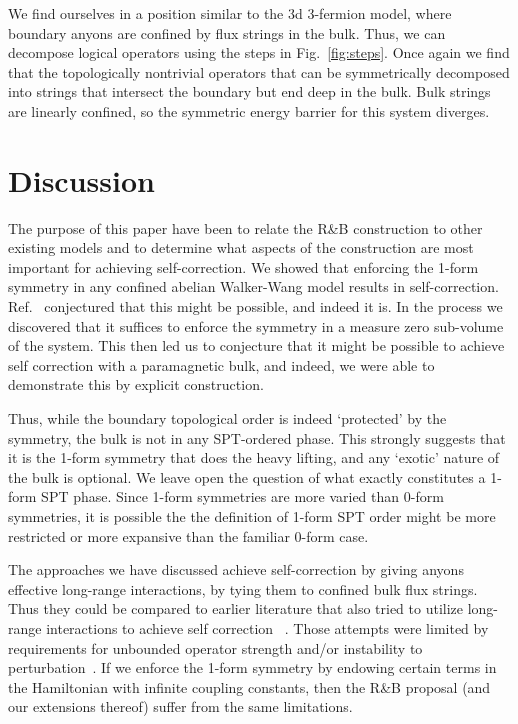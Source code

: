 \documentclass[twocolumn, longbibliography]{revtex4-2}
\begin{document}
We find ourselves in a position similar to the 3d 3-fermion model, where boundary anyons are confined by flux strings in the bulk. Thus, we can decompose logical operators using the steps in Fig.~\ref{fig:steps}. Once again we find that the topologically nontrivial operators that can be symmetrically decomposed into strings that intersect the boundary but end deep in the bulk. Bulk strings are linearly confined, so the symmetric energy barrier for this system diverges.

\section{Discussion}

The  purpose of this paper have been to relate the R\&B construction to other existing models and to determine what aspects of the construction are most important for achieving self-correction. We showed that enforcing the 1-form symmetry in any confined abelian Walker-Wang model results in self-correction. Ref.~\cite{RobertsBartlett} conjectured that this might be possible, and indeed it is. In the process we discovered that it suffices to enforce the symmetry in a measure zero sub-volume of the system. This then led us to conjecture that it might be possible to achieve self correction with a paramagnetic bulk, and indeed, we were able to demonstrate this by explicit construction. 

Thus, while the boundary topological order is indeed `protected' by the symmetry, the bulk is not in any SPT-ordered phase. 
This strongly suggests that it is the 1-form symmetry that does the heavy lifting, and any `exotic' nature of the bulk is optional. 
We leave open the question of what exactly constitutes a 1-form SPT phase. Since 1-form symmetries are more varied than 0-form symmetries, it is possible the the definition of 1-form SPT order might be more restricted or more expansive than the familiar 0-form case.

The approaches we have discussed achieve self-correction by giving anyons effective long-range interactions, by tying them to confined bulk flux strings. Thus they could be compared to earlier literature that also tried to utilize long-range interactions to achieve self correction ~\cite{Hamma2009, Chesi2010, Pedrocchi2011, Hutter2012, Wootton2013, Becker2013, Pedrocchi2013, Hutter2014}.
Those attempts were limited by requirements for unbounded operator strength and/or instability to perturbation~\cite{LandonCardinal2015, Brown2016}. If we enforce the 1-form symmetry by endowing certain terms in the Hamiltonian with infinite coupling constants, then the R\&B proposal (and our extensions thereof) suffer from the same limitations. 
\end{document}
